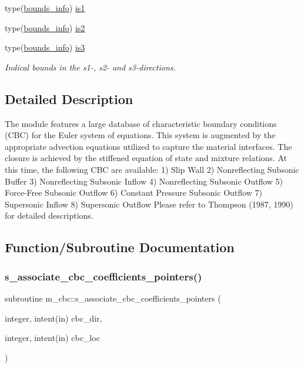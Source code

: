 \begin{DoxyCompactItemize}
type(\hyperlink{structm__derived__types_1_1bounds__info}{bounds\+\_\+info}) \hyperlink{namespacem__cbc_a2995ecb6263724a4421d1622f513103c}{is1}
\item 
type(\hyperlink{structm__derived__types_1_1bounds__info}{bounds\+\_\+info}) \hyperlink{namespacem__cbc_acfe8efda790266c75260db5e3917d337}{is2}
\item 
type(\hyperlink{structm__derived__types_1_1bounds__info}{bounds\+\_\+info}) \hyperlink{namespacem__cbc_a8477d940e9515138e8405c9302a026c8}{is3}
\begin{DoxyCompactList}\small\item\em Indical bounds in the s1-\/, s2-\/ and s3-\/directions. \end{DoxyCompactList}\end{DoxyCompactItemize}


\subsection{Detailed Description}
The module features a large database of characteristic boundary conditions (C\+BC) for the Euler system of equations. This system is augmented by the appropriate advection equations utilized to capture the material interfaces. The closure is achieved by the stiffened equation of state and mixture relations. At this time, the following C\+BC are available\+: 1) Slip Wall 2) Nonreflecting Subsonic Buffer 3) Nonreflecting Subsonic Inflow 4) Nonreflecting Subsonic Outflow 5) Force-\/\+Free Subsonic Outflow 6) Constant Pressure Subsonic Outflow 7) Supersonic Inflow 8) Supersonic Outflow Please refer to Thompson (1987, 1990) for detailed descriptions. 

\subsection{Function/\+Subroutine Documentation}
\mbox{\label{namespacem__cbc_a76e19dea2a654c9a7f311baa16ef118c}} 
\subsubsection{\texorpdfstring{s\+\_\+associate\+\_\+cbc\+\_\+coefficients\+\_\+pointers()}{s\_associate\_cbc\_coefficients\_pointers()}}
{\footnotesize\ttfamily subroutine m\+\_\+cbc\+::s\+\_\+associate\+\_\+cbc\+\_\+coefficients\+\_\+pointers (\begin{DoxyParamCaption}\item[{integer, intent(in)}]{cbc\+\_\+dir,  }\item[{integer, intent(in)}]{cbc\+\_\+loc }\end{DoxyParamCaption})}



